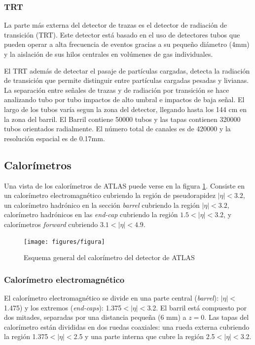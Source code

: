 \subsubsection{TRT}
La parte más externa del detector de trazas es el detector de radiación de
transición (TRT). Este detector está basado en el uso de detectores tubos que
pueden operar a alta frecuencia de eventos gracias a su pequeño diámetro (4mm) y
la aislación de sus hilos centrales en volúmenes de gas individuales.

El TRT además de detectar el pasaje de partículas cargadas, detecta la radiación
de transición que permite distinguir entre partículas cargadas pesadas y
livianas. La separación entre señales de trazas y de radiación por transición se
hace analizando tubo por tubo impactos de alto umbral e impactos de baja señal.
El largo de los tubos varía segun la zona del detector, llegando hasta los 144
cm en la zona del barril. El Barril contiene 50000 tubos y las tapas contienen
320000 tubos orientados radialmente. El número total de canales es de 420000 y
la resolución espacial es de 0.17mm.


\subsection{Calorímetros}

Una vista de los calorímetros de ATLAS puede verse en la figura \ref{fig:calo}.
Consiste en un calorímetro electromagnético cubriendo la región de pseudorapidez
$|\eta| < 3.2$, un calorímetro hadrónico en la sección \emph{barrel} cubriendo
la región $|\eta| < 3.2$, calorímetro hadrónicos en las \emph{end-cap} cubriendo
la región $1.5 < |\eta| < 3.2$, y calorímetros \emph{forward} cubriendo $3.1 <
|\eta| < 4.9$.

\begin{figure}[H]
  \centering \texttt{[image: figures/figura]}
  \caption{Esquema general del calorímetro del detector de
    ATLAS}\label{fig:calo}
\end{figure}


\subsubsection{Calorímetro electromagnético}
El calorímetro electromagnético \cite{caloemTDR} se divide en una parte central
(\emph{barrel}): $|\eta|<$1.475) y los extremos (\emph{end-caps}):
1.375$<|\eta|<$3.2. El barril está compuesto por dos mitades, separadas por una
distancia pequeña (6 mm) a $z = 0$. Las tapas del calorímetro están divididas en
dos ruedas coaxiales: una rueda externa cubriendo la región 1.375$<|\eta|<$2.5 y
una parte interna que cubre la región 2.5$<|\eta|<$3.2.

